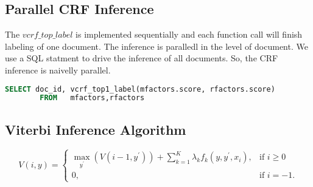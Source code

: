 \subsection{Parallel CRF Inference}
The $vcrf\_top\_label$ is implemented sequentially and each function call will finish labeling of one document.
The inference is paralledl in the level of document. We use a SQL statment to drive the inference of all documents.
So, the CRF inference is naivelly parallel.
\begin{lstlisting}[language=SQL,gobble=4]
        SELECT doc_id, vcrf_top1_label(mfactors.score, rfactors.score)
        FROM   mfactors,rfactors
\end{lstlisting}

\subsection{Viterbi Inference Algorithm}
\[
V(i,y) =
\begin{cases}
 \max_{y^\prime}(V(i-1,y^\prime)) + \textstyle \sum_{k=1}^K \lambda_kf_k(y,y^\prime,x_i), & \text{if } i\ge0 \\
 0, & \text{if } i=-1.
\end{cases}
\]

